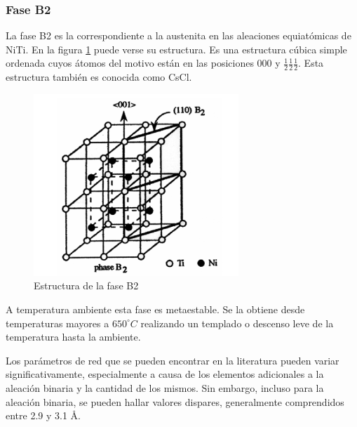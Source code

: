 \documentclass[12pt]{article}
\theoremstyle{definition}
\theoremstyle{remark}
\begin{document}
\subsubsection{Fase B2}
La fase B2 es la correspondiente a la austenita en las aleaciones equiatómicas de NiTi. En la figura \ref{B2phase} puede verse su estructura. Es una estructura cúbica simple ordenada cuyos átomos del motivo están en las posiciones 000 y $\frac{1}{2}\frac{1}{2}\frac{1}{2}$. Esta estructura también es conocida como CsCl.
\begin{figure}[H]
	\centering
	\includegraphics[scale=0.4]{img/B2Phase.png}
	\caption{Estructura de la fase B2}
	\label{B2phase}
\end{figure}

A temperatura ambiente esta fase es metaestable. Se la obtiene desde temperaturas mayores a $650 ^\circ C$ realizando un templado o descenso leve de la temperatura hasta la ambiente.

Los parámetros de red que se pueden encontrar en la literatura pueden variar significativamente, especialmente a causa de los elementos adicionales a la aleación binaria y la cantidad de los mismos. Sin embargo, incluso para la aleación binaria, se pueden hallar valores dispares, generalmente comprendidos entre 2.9 y 3.1 \AA.
\end{document}
